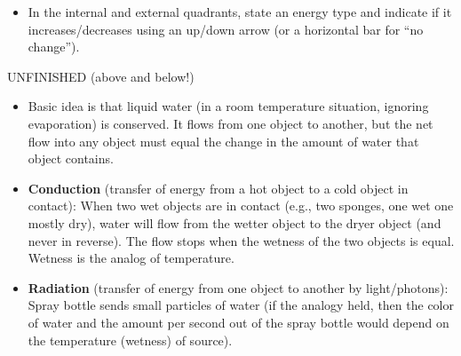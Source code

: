 \documentclass[12pt]{article}
\begin{document}
\begin{itemize}
\begin{itemize}
	\item In the internal and external quadrants, state an energy type and indicate if it increases/decreases using an up/down arrow (or a horizontal bar for ``no change'').
		\end{itemize}
	UNFINISHED (above and below!)
	\end{itemize}
	

	\begin{itemize}
	
	\item Basic idea is that liquid water (in a room temperature situation, ignoring evaporation) is conserved.  It flows from one object to another, but the net flow into any object must equal the change in the amount of water that object contains.
	
	
	\item {\bf Conduction} (transfer of energy from a hot object to a cold object in contact): When two wet objects are in contact (e.g., two sponges, one wet one mostly dry), water will flow from the wetter object to the dryer object (and never in reverse).  The flow stops when the wetness of the two objects is equal.  Wetness is the analog of temperature.
	
	\item {\bf Radiation} (transfer of energy from one object to another by light/photons):  Spray bottle sends small particles of water (if the analogy held, then the color of water and the amount per second out of the spray bottle would depend on the temperature (wetness) of source).

	\end{itemize}





\end{document}
